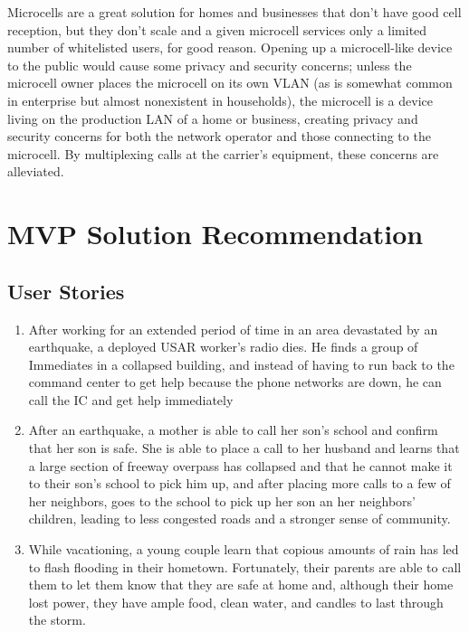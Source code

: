 \documentclass[10pt]{article}
\begin{document}
Microcells are a great solution for homes and businesses that don't have good
cell reception, but they don't scale and a given microcell services only a
limited number of whitelisted users, for good reason.  Opening up a
microcell-like device to the public would cause some privacy and security
concerns; unless the microcell owner places the microcell on its own VLAN (as is
somewhat common in enterprise but almost nonexistent in households), the
microcell is a device living on the production LAN of a home or business,
creating privacy and security concerns for both the network operator and those
connecting to the microcell.  By multiplexing calls at the carrier's equipment,
these concerns are alleviated.

\section{MVP Solution Recommendation}
\subsection*{User Stories}
\begin{enumerate}
    \item After working for an extended period of time in an area devastated by
        an earthquake, a deployed USAR worker's radio dies.  He finds a group of
        Immediates in a collapsed building, and instead of having to run back to
        the command center to get help because the phone networks are down, he
        can call the IC and get help immediately
    \item After an earthquake, a mother is able to call her son's school and
        confirm that her son is safe.  She is able to place a call to her
        husband and learns that a large section of freeway overpass has
        collapsed and that he cannot make it to their son's school to pick him
        up, and after placing more calls to a few of her neighbors, goes to the
        school to pick up her son an her neighbors' children, leading to less
        congested roads and a stronger sense of community.
    \item While vacationing, a young couple learn that copious amounts of rain
        has led to flash flooding in their hometown.  Fortunately, their parents
        are able to call them to let them know that they are safe at home and,
        although their home lost power, they have ample food, clean water, and
        candles to last through the storm.
\end{enumerate}
\end{document}
